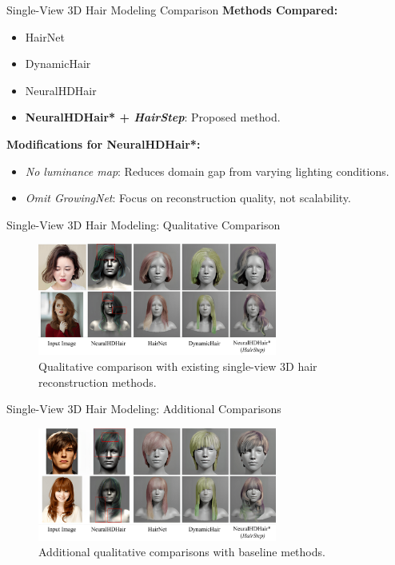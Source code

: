 \begin{frame}[t]{Single-View 3D Hair Modeling Comparison}
    \textbf{Methods Compared:}
    \begin{itemize}
        \item HairNet~\cite{Zhou2018SingleViewHR}
        \item DynamicHair~\cite{Yang2019DynamicHM}
        \item NeuralHDHair~\cite{wu2022neuralhdhair}
        \item \textbf{NeuralHDHair* + \emph{HairStep}}: Proposed method.
    \end{itemize}

    \vspace{5pt}
    \textbf{Modifications for NeuralHDHair*:}
    \begin{itemize}
        \item \emph{No luminance map}: Reduces domain gap from varying lighting conditions.
        \item \emph{Omit GrowingNet}: Focus on reconstruction quality, not scalability.
    \end{itemize}
\end{frame}

\begin{frame}{Single-View 3D Hair Modeling: Qualitative Comparison}
    \begin{figure}
        \centering
        \includegraphics[width=0.7\textwidth]{assets/figures/eval/existing-methods-vis-comparison-1.png}
        \caption{Qualitative comparison with existing single-view 3D hair reconstruction methods.}
    \end{figure}
\end{frame}

\begin{frame}{Single-View 3D Hair Modeling: Additional Comparisons}
    \begin{figure}
        \centering
        \includegraphics[width=0.7\textwidth]{assets/figures/eval/existing-methods-vis-comparison-2.png}
        \caption{Additional qualitative comparisons with baseline methods.}
    \end{figure}
\end{frame}

